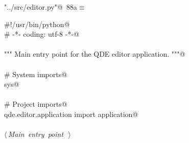 \documentclass[
    a4paper,      %
    10pt,         %
    openright,    %
    notitlepage,  %
    parskip=half, %
]{scrreprt}       %
\theoremstyle{definition}                    %
\begin{document}
\begin{flushleft} \small
\begin{minipage}{\linewidth}\label{scrap138}\raggedright\small
{} \verb@"../src/editor.py"@\nobreak\ {\footnotesize {88a}}$\equiv$
\vspace{-1ex}
\begin{list}{}{} \item
\mbox{}\lstinline@#!/usr/bin/python@\\
\mbox{}\lstinline@# -*- coding: utf-8 -*-@\\
\mbox{}\lstinline@@\\
\mbox{}\lstinline@""" Main entry point for the QDE editor application. """@\\
\mbox{}\lstinline@@\\
\mbox{}\lstinline@# System imports@\\
\mbox{}\lstinline@import sys@\\
\mbox{}\lstinline@@\\
\mbox{}\lstinline@# Project imports@\\
\mbox{}\lstinline@from qde.editor.application import application@\\
\mbox{}\lstinline@@\\
\mbox{}\lstinline@@\hbox{$\langle\,${\itshape Main entry point}\nobreak\ {\footnotesize {}}$\,\rangle$}\lstinline@@\\
\mbox{}\lstinline@@{\NWsep}
\end{list}
\vspace{-1.5ex}
\footnotesize
\begin{list}{}{\setlength{\itemsep}{-\parsep}\setlength{\itemindent}{-\leftmargin}}

\item{}
\end{list}
\end{minipage}\vspace{4ex}
\end{flushleft}
\end{document}
